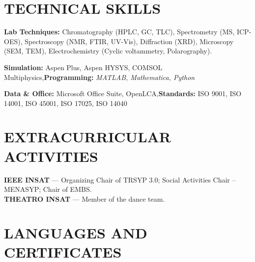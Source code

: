 \documentclass[10pt]{article}
\begin{document}
\section{TECHNICAL SKILLS}
\begin{bul}
\item \textbf{Lab Techniques:} Chromatography (HPLC, GC, TLC), Spectrometry (MS, ICP-OES), Spectroscopy (NMR, FTIR, UV-Vis), Diffraction (XRD), Microscopy (SEM, TEM), Electrochemistry (Cyclic voltammetry, Polarography).
\item \textbf{Simulation:} Aspen Plus, Aspen HYSYS, COMSOL Multiphysics\sep\textbf{Programming:} \textit{MATLAB, Mathematica, Python}
\item \textbf{Data \& Office:} Microsoft Office Suite, OpenLCA\sep\textbf{Standards:} ISO 9001, ISO 14001, ISO 45001, ISO 17025, ISO 14040
\end{bul}

\section{EXTRACURRICULAR ACTIVITIES}
\textbf{IEEE INSAT} — Organizing Chair of TRSYP 3.0; Social Activities Chair – MENASYP; Chair of EMBS.\\
\textbf{THEATRO INSAT} — Member of the dance team.\par

\section{LANGUAGES AND CERTIFICATES}
\end{document}
